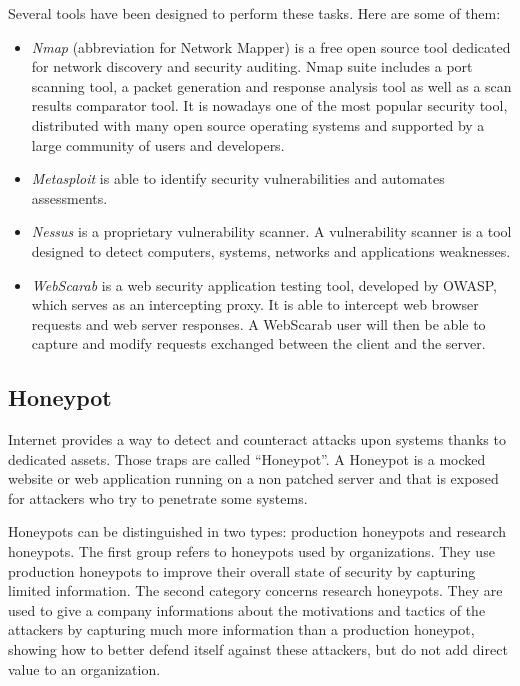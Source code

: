 Several tools have been designed to perform these tasks.
Here are some of them:
\begin{itemize}
\item \textit{Nmap} (abbreviation for Network Mapper) is a free open source tool
	dedicated for network discovery and security auditing. Nmap suite includes
	a port scanning tool, a packet generation and response analysis tool as
	well as a scan results comparator tool.  It is nowadays one of the most
	popular security tool, distributed with many open source operating systems
	and supported by a large community of users and developers.
\item \textit{Metasploit} is able to identify security vulnerabilities and
	automates assessments.
\item \textit{Nessus} is a proprietary vulnerability scanner. A vulnerability
	scanner is a tool designed to detect computers, systems, networks and
	applications weaknesses.
\item \textit{WebScarab} is a web security application testing tool, developed
	by OWASP, which serves as an intercepting proxy.
	It is able to intercept web browser requests and web server
	responses. A WebScarab user will then be able to capture and modify
	requests exchanged between the client and the server.
\end{itemize}

\subsection{Honeypot}

Internet provides a way to detect and counteract attacks upon systems thanks to
dedicated assets. Those traps are called ``Honeypot''. A Honeypot is a mocked
website or web application running on a non patched server and that is exposed
for attackers who try to penetrate some systems.

Honeypots can be distinguished in two types: production honeypots and research
honeypots. The first group refers to honeypots used by organizations. They use
production honeypots to improve their overall state of security by capturing
limited information. The second category concerns research honeypots. They are
used to give a company informations about the motivations and tactics of the
attackers by capturing much more information than a production honeypot,
showing how to better defend itself against these attackers, but do not add
direct value to an organization.


